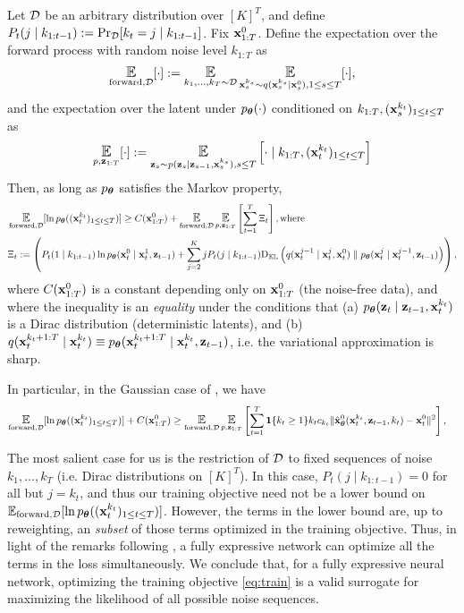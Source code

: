 \begin{theorem}\label{thm:main_elbo_general} Let $\mathcal{D}$ be an arbitrary distribution over $[K]^T$, and define $P_t(j \mid k_{1:t-1}) := \Pr_{\mathcal{D}}[k_t = j \mid k_{1:t-1}]$.
Fix $\mathbf{x}_{1:T}^{0}$. Define the expectation over the forward process with random noise level $k_{1:T}$ as 
\begin{align}
\EforwardD[\cdot] := \Exp_{k_{1},\dots,k_T \sim \cD}\Exp_{\bx_{s}^{k_s}\sim q(\bx_{s}^{k_s} \mid \bx_s^0),1 \le s \le T}[\cdot],
\end{align}
and the expectation over the latent under $p_{\bm{\theta}}(\cdot)$ conditioned on $k_{1:T},(\mathbf{x}_{s}^{k_t})_{1 \le t \le T}$ as 
\begin{align}
\Epz[\cdot] := \Exp_{\bz_{s} \sim p (\bz_{s} \mid \bz_{s-1},\bx_s^{k_s}), s\le T}\left[\cdot \mid k_{1:T}, (\bx_t^{k_t})_{1 \le t \le T}\right]
\end{align}
 Then, as long as $p_{\bm{\theta}}$ satisfies the Markov property, 
\begin{align*}
&\EforwardD[\ln  \ptheta((\bx_{t}^{k_t})_{1 \le t \le T})] \ge C(\bx_{1:T}^0) +  \EforwardD\Epz \left[\sum_{t=1}^T \Xi_t\right], \text{where } \\
&\Xi_t :=  \left(P_t(1 \mid k_{1:t-1})\ln \ptheta(\bx_t^{0} \mid \bx_{t}^{1},  \bz_{t-1}) +  \sum_{j=2}^{K}j P_t(j \mid k_{1:t-1}) \Dkl\left(q(\bx_{t}^{j-1} \mid \bx_t^{j},\bx_t^0) \parallel \ptheta(\bx_{t}^{j} \mid \bx_{t}^{j-1}, \bz_{t-1})\right)\right), 
\end{align*}
 where $C(\mathbf{x}_{1:T}^0)$ is a constant depending only on $\mathbf{x}_{1:T}^0$ (the noise-free data), and where the inequality is an \emph{equality} under the conditions that (a) $p_{\bm{\theta}}(\mathbf{z}_t \mid \mathbf{z}_{t-1},\mathbf{x}_t^{k_t})$ is a Dirac distribution (deterministic latents), and (b) $q(\mathbf{x}_{t}^{k_t+1:T} \mid \mathbf{x}_t^{k_t}) \equiv p_{\bm{\theta}}(\mathbf{x}_{t}^{k_t+1:T} \mid \mathbf{x}_t^{k_t},\mathbf{z}_{t-1})$, i.e. the variational approximation is sharp. 

 In particular, in the Gaussian case of , we have
     \begin{align*}
\EforwardD[\ln  \ptheta((\bx_{t}^{k_t})_{1 \le t \le T})] + C(\bx_{1:T}^0)  
&\ge \EforwardD\Epz \left[\sum_{t=1}^T  \I\{k_t \ge 1\} k_t c_{k_t} \| \hat{\bx}^0_{\bm{\theta}}(\bx_{t}^{k_t},\bz_{t-1},{k_t}) - \bx_t^0\|^2 \right],
\end{align*}

\end{theorem}
The most salient case for us is the restriction of $\mathcal{D}$ to fixed sequences of noise $k_1,\dots,k_T$ (i.e. Dirac distributions on $[K]^T$). In this case, $P_t(j \mid k_{1:t-1}) = 0$ for all but $j = k_t$, and thus our training objective need not be a lower bound on $\EforwardD[\ln  \ptheta((\bx_{t}^{k_t})_{1 \le t \le T})]$. However, the terms in the lower bound are, up to reweighting, an \emph{subset} of those terms optimized in the training objective. Thus, in light of the remarks following , a fully expressive network can optimize all the terms in the loss simultaneously. We conclude that, for a fully expressive neural network, optimizing the training objective \eqref{eq:train} is a valid surrogate for maximizing the likelihood of all possible noise sequences. 


